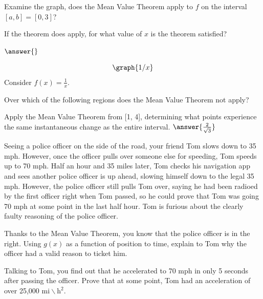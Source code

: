 \documentclass{ximera}
\begin{document}
\begin{question}
Examine the graph, does the Mean Value Theorem apply to $f$ on the interval $[a,b]=[0,3]$?

\begin{multipleChoice}
\end{multipleChoice}

If the theorem does apply, for what value of $x$ is the theorem satisfied?

$\answer{}$
\end{question}

\begin{question}
\[
\graph{1/x}
\]
Consider $f(x) = \frac{1}{x}$.

Over which of the following regions does the Mean Value Theorem not apply?

\begin{selectAll}
\choice{$[1,2]$}
\choice{$(0,4]$}
\choice[correct]{$[-1,1]$}
\choice[correct]{$[0,2]$}
\choice{$[-5,0)$}
\end{selectAll}

Apply the Mean Value Theorem from [1, 4], determining what points experience the same instantaneous change as the entire interval.
$\answer{\frac{2}{\sqrt{3}}}$
\end{question}

\begin{question}
Seeing a police officer on the side of the road, your friend Tom slows down to 35 mph. However, once the officer pulls over someone else for speeding, Tom speeds up to 70 mph. Half an hour and 35 miles later, Tom checks his navigation app and sees another police officer is up ahead, slowing himself down to the legal 35 mph. However, the police officer still pulls Tom over, saying he had been radioed by the first officer right when Tom passed, so he could prove that Tom was going 70 mph at some point in the last half hour. Tom is furious about the clearly faulty reasoning of the police officer.

Thanks to the Mean Value Theorem, you know that the police officer is in the right. Using $g(x)$ as a function of position to time, explain to Tom why the officer had a valid reason to ticket him.

\begin{freeResponse}
\end{freeResponse}

Talking to Tom, you find out that he accelerated to 70 mph in only 5 seconds after passing the officer. Prove that at some point, Tom had an acceleration of over 25,000 $\text{mi} \backslash \text{h}^2$.

\begin{freeResponse}
\end{freeResponse}
\end{question}
\end{document}
